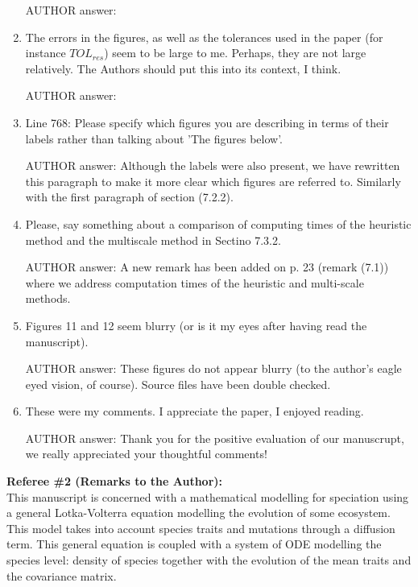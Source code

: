 \documentclass[a4paper,11pt]{scrartcl}
\begin{document}
\begin{enumerate}
AUTHOR answer:

\item
The errors in the figures, as well as the tolerances used in the paper (for instance $TOL_{res}$) seem to be large to me. Perhaps, they are not large relatively. The Authors should put this into its context, I think.

AUTHOR answer:

\item
Line 768: Please specify which figures you are describing in terms of their labels rather than talking about 'The figures below'.

AUTHOR answer: Although the labels were also present, we have rewritten this paragraph to make it more clear which figures are referred to. Similarly with the first paragraph of section (7.2.2).

\item
Please, say something about a comparison of computing times of the heuristic method and the multiscale method in Sectino 7.3.2.

AUTHOR answer: A new remark has been added on p. 23 (remark (7.1)) where we address computation times of the heuristic and multi-scale methods.

\item
Figures 11 and 12 seem blurry (or is it my eyes after having read the manuscript).

AUTHOR answer: These figures do not appear blurry (to the author's eagle eyed vision, of course). Source files have been double checked.

\item
These were my comments. I appreciate the paper, I enjoyed reading.

AUTHOR answer: Thank you for the positive evaluation of our manuscrupt, we really appreciated your thoughtful comments!
\end{enumerate}
\textbf{Referee \#2  (Remarks to the Author):}\\

This manuscript is concerned with a mathematical modelling for speciation using a general Lotka-Volterra equation modelling the evolution of some ecosystem. This model takes into account species traits and mutations through a diffusion term. This general equation is coupled with a system of ODE modelling the species level: density of species together with the evolution of the mean traits and the covariance matrix.
\end{document}
